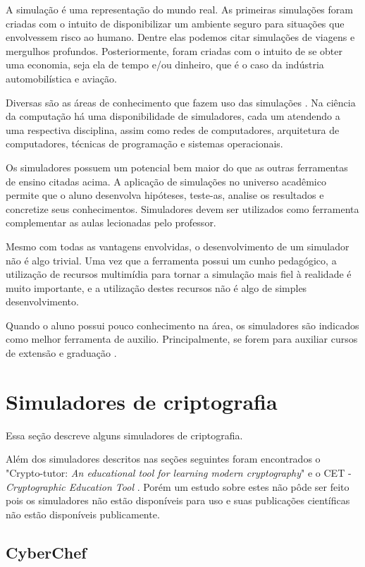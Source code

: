 A simulação é uma representação do mundo real. As primeiras simulações foram criadas com o intuito de disponibilizar um ambiente seguro para situações que envolvessem risco ao humano. Dentre elas podemos citar simulações de viagens e mergulhos profundos. Posteriormente, foram criadas com o intuito de se obter uma economia, seja ela de tempo e/ou dinheiro, que é o caso da indústria automobilística e aviação.

Diversas são as áreas de conhecimento que fazem uso das simulações \cite{banks09}. Na ciência da computação há uma disponibilidade de simuladores, cada um atendendo a uma respectiva disciplina, assim como redes de computadores, arquitetura de computadores, técnicas de programação e sistemas operacionais.

Os simuladores possuem um potencial bem maior do que as outras ferramentas de ensino citadas acima. A aplicação de simulações no universo acadêmico permite que o aluno desenvolva hipóteses, teste-as, analise os resultados e concretize seus conhecimentos. Simuladores devem ser utilizados como ferramenta complementar as aulas lecionadas pelo professor.

Mesmo com todas as vantagens envolvidas, o desenvolvimento de um simulador não é algo trivial. Uma vez que a ferramenta possui um cunho pedagógico, a utilização de recursos multimídia para tornar a simulação mais fiel à realidade é muito importante, e a utilização destes recursos não é algo de simples desenvolvimento.

Quando o aluno possui pouco conhecimento na área, os simuladores são indicados como melhor ferramenta de auxilio. Principalmente, se forem para auxiliar cursos de extensão e graduação \cite{maia01} \cite{maia03}. 

\section{Simuladores de criptografia}
\label{sec:simuladorescriptografia}
Essa seção descreve alguns simuladores de criptografia.

Além dos simuladores descritos nas seções seguintes foram encontrados o "Crypto-tutor: \textit{An educational tool for learning modern cryptography}" \cite{luburic16} e o CET - \textit{Cryptographic Education Tool} \cite{abuzaid11}. Porém um estudo sobre estes não pôde ser feito pois os simuladores não estão disponíveis para uso e suas publicações científicas não estão disponíveis publicamente.

\subsection{CyberChef}

